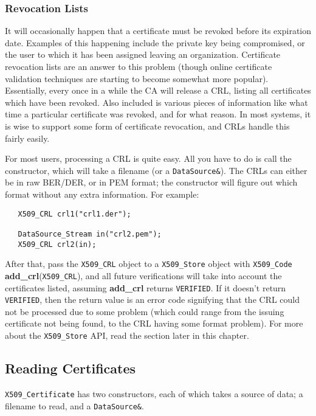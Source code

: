 \documentclass{article}
\newcommand{\function}[1]{\textbf{#1}}
\newcommand{\type}[1]{\texttt{#1}}
\begin{document}
\subsubsection{Revocation Lists}

It will occasionally happen that a certificate must be revoked before its
expiration date. Examples of this happening include the private key being
compromised, or the user to which it has been assigned leaving an
organization. Certificate revocation lists are an answer to this problem
(though online certificate validation techniques are starting to become
somewhat more popular). Essentially, every once in a while the CA will release
a CRL, listing all certificates which have been revoked. Also included is
various pieces of information like what time a particular certificate was
revoked, and for what reason. In most systems, it is wise to support some form
of certificate revocation, and CRLs handle this fairly easily.

For most users, processing a CRL is quite easy. All you have to do is call the
constructor, which will take a filename (or a \type{DataSource\&}). The CRLs
can either be in raw BER/DER, or in PEM format; the constructor will figure out
which format without any extra information. For example:

\begin{verbatim}
   X509_CRL crl1("crl1.der");

   DataSource_Stream in("crl2.pem");
   X509_CRL crl2(in);
\end{verbatim}

After that, pass the \type{X509\_CRL} object to a \type{X509\_Store} object
with \type{X509\_Code} \function{add\_crl}(\type{X509\_CRL}), and all future
verifications will take into account the certificates listed, assuming
\function{add\_crl} returns \type{VERIFIED}. If it doesn't return
\type{VERIFIED}, then the return value is an error code signifying that the CRL
could not be processed due to some problem (which could range from the issuing
certificate not being found, to the CRL having some format problem). For more
about the \type{X509\_Store} API, read the section later in this chapter.

\subsection{Reading Certificates}

\type{X509\_Certificate} has two constructors, each of which takes a source of
data; a filename to read, and a \type{DataSource\&}.
\end{document}
